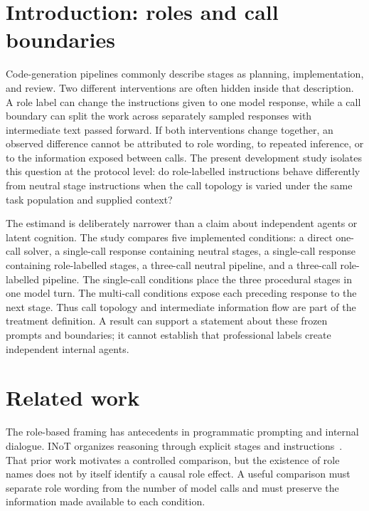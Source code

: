 \section{Introduction: roles and call boundaries}
\label{sec:dev40-context}

Code-generation pipelines commonly describe stages as planning, implementation, and review. Two different interventions are often hidden inside that description. A role label can change the instructions given to one model response, while a call boundary can split the work across separately sampled responses with intermediate text passed forward. If both interventions change together, an observed difference cannot be attributed to role wording, to repeated inference, or to the information exposed between calls. The present development study isolates this question at the protocol level: do role-labelled instructions behave differently from neutral stage instructions when the call topology is varied under the same task population and supplied context?

The estimand is deliberately narrower than a claim about independent agents or latent cognition. The study compares five implemented conditions: a direct one-call solver, a single-call response containing neutral stages, a single-call response containing role-labelled stages, a three-call neutral pipeline, and a three-call role-labelled pipeline. The single-call conditions place the three procedural stages in one model turn. The multi-call conditions expose each preceding response to the next stage. Thus call topology and intermediate information flow are part of the treatment definition. A result can support a statement about these frozen prompts and boundaries; it cannot establish that professional labels create independent internal agents.

\section{Related work}
\label{sec:dev40-related}

The role-based framing has antecedents in programmatic prompting and internal dialogue. INoT organizes reasoning through explicit stages and instructions~\cite{sun2025inot}. That prior work motivates a controlled comparison, but the existence of role names does not by itself identify a causal role effect. A useful comparison must separate role wording from the number of model calls and must preserve the information made available to each condition.

